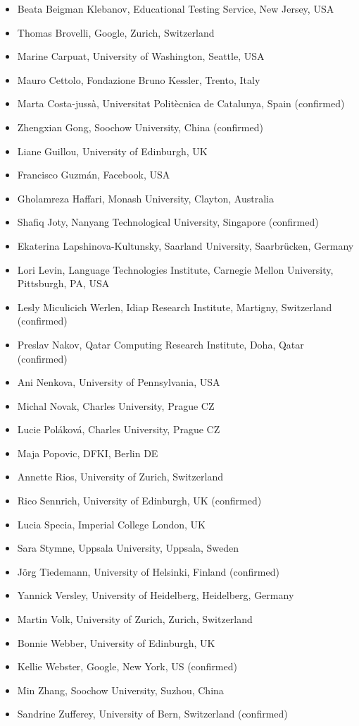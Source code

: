 \documentclass[11pt]{article}
\begin{document}
\begin{itemize} \setlength{\itemsep}{0pt}
\item Beata Beigman Klebanov, Educational Testing Service, New Jersey, USA
\item Thomas Brovelli, Google, Zurich, Switzerland %
\item Marine Carpuat, University of Washington, Seattle, USA
\item Mauro Cettolo, Fondazione Bruno Kessler, Trento, Italy
\item Marta Costa-jussà, Universitat Politècnica de Catalunya, Spain (confirmed)
\item Zhengxian Gong, Soochow University, China (confirmed)
\item Liane Guillou, University of Edinburgh, UK
\item Francisco Guzm\'{a}n, Facebook, USA
\item Gholamreza Haffari, Monash University, Clayton, Australia
\item Shafiq Joty, Nanyang Technological University, Singapore (confirmed)
\item Ekaterina Lapshinova-Kultunsky, Saarland University, Saarbrücken, Germany 
\item Lori Levin, Language Technologies Institute, Carnegie Mellon University, Pittsburgh, PA, USA %
\item Lesly Miculicich Werlen, Idiap Research Institute, Martigny, Switzerland (confirmed)
\item Preslav Nakov, Qatar Computing Research Institute, Doha, Qatar (confirmed)
\item Ani Nenkova, University of Pennsylvania, USA
\item Michal Novak, Charles University, Prague CZ %
\item Lucie Pol\'{a}kov\'{a}, Charles University, Prague CZ %
\item Maja Popovic, DFKI, Berlin DE
\item Annette Rios, University of Zurich, Switzerland
\item Rico Sennrich, University of Edinburgh, UK (confirmed)
\item Lucia Specia, Imperial College London, UK
\item Sara Stymne, Uppsala University, Uppsala, Sweden
\item Jörg Tiedemann, University of Helsinki, Finland (confirmed)
\item Yannick Versley, University of Heidelberg, Heidelberg, Germany %
\item Martin Volk, University of Zurich, Zurich, Switzerland
\item Bonnie Webber, University of Edinburgh, UK
\item Kellie Webster, Google, New York, US (confirmed)
\item Min Zhang, Soochow University, Suzhou, China
\item Sandrine Zufferey, University of Bern, Switzerland (confirmed)
\end{itemize}
\end{document}
